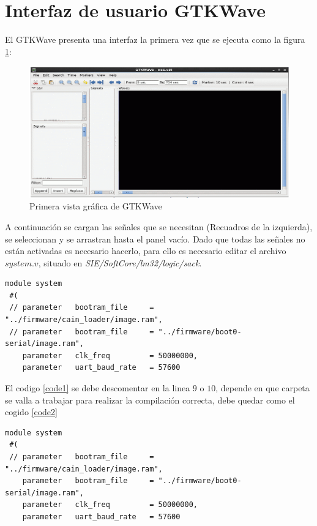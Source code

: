 \documentclass[10pt,graphicx,caption,rotating]{article}
\begin{document}
\section{Interfaz de usuario GTKWave}
\noindent
El GTKWave presenta una interfaz la primera vez que se ejecuta como la figura \ref{fig1}:
\begin{figure}[H]
	\centering
		\includegraphics[scale=0.6]{1.png}
	\caption{Primera vista gráfica de GTKWave}
	\label{fig1}
\end{figure}
\noindent
A continuación se cargan las señales que se necesitan (Recuadros de la izquierda), se seleccionan y se arrastran hasta el panel vacío. Dado que todas las señales no están activadas es necesario hacerlo, para ello es necesario editar el archivo $system.v$, situado en \textit{SIE/SoftCore/lm32/logic/sack}.
\lstset{numbers=left, numberstyle=\tiny, stepnumber=1, numbersep=1pt}
\begin{lstlisting}[firstnumber=7, caption=Codigo inicial, label=code1]
 module system
 #(
 //	parameter   bootram_file     = "../firmware/cain_loader/image.ram",	
 //	parameter   bootram_file     = "../firmware/boot0-serial/image.ram",
	parameter   clk_freq         = 50000000,
	parameter   uart_baud_rate   = 57600
\end{lstlisting}
\noindent
El codigo \ref{code1} se debe descomentar en la linea $9$ o $10$, depende en que carpeta se valla a trabajar para realizar la compilación correcta, debe quedar como el cogido \ref{code2}
\begin{lstlisting}[firstnumber=7, caption=Código para trabajar en boot0-serial, label=code2]
 module system
 #(
 //	parameter   bootram_file     = "../firmware/cain_loader/image.ram",	
	parameter   bootram_file     = "../firmware/boot0-serial/image.ram",
	parameter   clk_freq         = 50000000,
	parameter   uart_baud_rate   = 57600
\end{lstlisting}
\noindent
\end{document}

